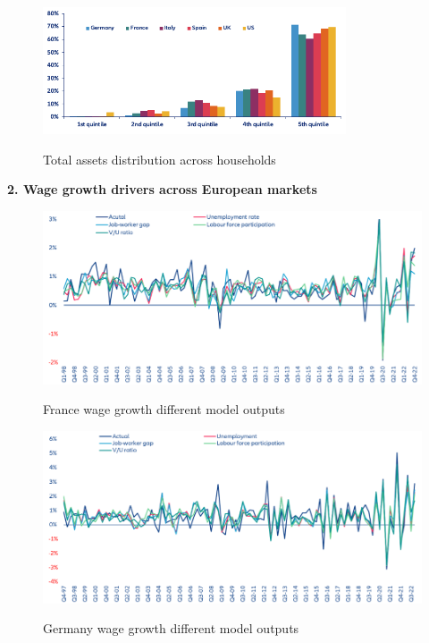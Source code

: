 \begin{figure}[H]
    \centering
    \caption{Total assets distribution across households}
    \includegraphics[width=0.8\textwidth]{Core/1.Savings/img/savings_distrib.png}
    \label{figure:savings_distrib}
\end{figure}

\newpage
\large{\textbf{2. Wage growth drivers across European markets}}

\begin{figure}[H]
    \centering
    \caption{France wage growth different model outputs}
    \includegraphics[width=.95\textwidth]{Core/2.Labour/img/France output.png}
    \label{figure:fr_output}
\end{figure}

\begin{figure}[H]
    \centering
    \caption{Germany wage growth different model outputs}
    \includegraphics[width=.95\textwidth]{Core/2.Labour/img/Germany output.png}
    \label{figure:ger_output}
\end{figure}

